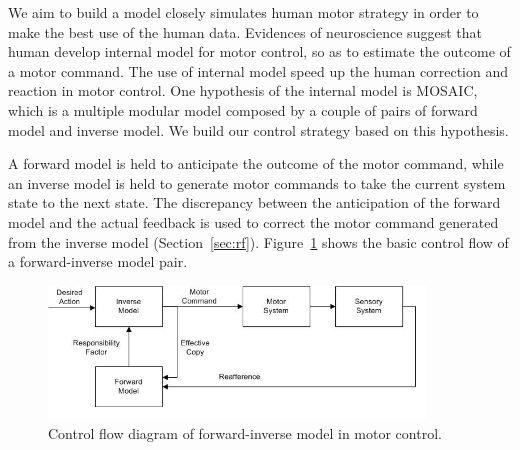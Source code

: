 \documentclass[preprint,12pt]{elsarticle}
\begin{document}


We aim to build a model closely simulates human motor strategy in order to make the best use of the human data. Evidences of neuroscience suggest that human develop internal model for motor control, so as to estimate the outcome of a motor command. The use of internal model speed up the human correction and reaction in motor control. One hypothesis of the internal model is MOSAIC, which is a multiple modular model composed by a couple of pairs of forward model and inverse model. We build our control strategy based on this hypothesis.

A forward model is held to anticipate the outcome of the motor command, while an inverse model is held to generate motor commands to take the current system state to the next state. The discrepancy between the anticipation of the forward model and the actual feedback is used to correct the motor command generated from the inverse model (Section~\ref{sec:rf}). Figure~\ref{fig:control} shows the basic control flow of a forward-inverse model pair.

\begin{figure}
  \centering
  \includegraphics[width=10cm]{./fig/control_1.jpg}
  \caption{ \scriptsize{Control flow diagram of forward-inverse model in motor control.}
}
\label{fig:control}
\end{figure}
\end{document}
